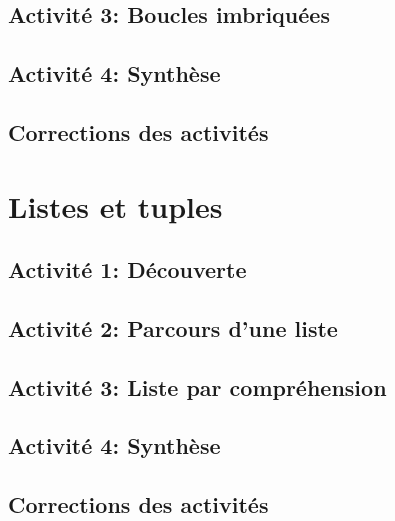 \documentclass[
]{book}
\begin{document}
\hypertarget{activituxe9-3-boucles-imbriquuxe9es}{%
\section{Activité 3: Boucles imbriquées}\label{activituxe9-3-boucles-imbriquuxe9es}}

\hypertarget{activituxe9-4-synthuxe8se}{%
\section{Activité 4: Synthèse}\label{activituxe9-4-synthuxe8se}}

\hypertarget{corrections-des-activituxe9s}{%
\section{Corrections des activités}\label{corrections-des-activituxe9s}}

\hypertarget{listes-et-tuples}{%
\chapter{Listes et tuples}\label{listes-et-tuples}}

\hypertarget{activituxe9-1-duxe9couverte}{%
\section{Activité 1: Découverte}\label{activituxe9-1-duxe9couverte}}

\hypertarget{activituxe9-2-parcours-dune-liste}{%
\section{Activité 2: Parcours d'une liste}\label{activituxe9-2-parcours-dune-liste}}

\hypertarget{activituxe9-3-liste-par-compruxe9hension}{%
\section{Activité 3: Liste par compréhension}\label{activituxe9-3-liste-par-compruxe9hension}}

\hypertarget{activituxe9-4-synthuxe8se-1}{%
\section{Activité 4: Synthèse}\label{activituxe9-4-synthuxe8se-1}}

\hypertarget{corrections-des-activituxe9s-1}{%
\section{Corrections des activités}\label{corrections-des-activituxe9s-1}}
\end{document}
